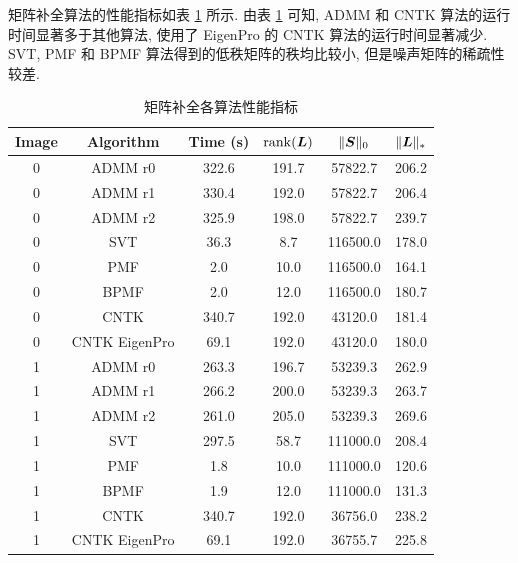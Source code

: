 \documentclass[12pt]{article}
\begin{document}
矩阵补全算法的性能指标如表 \ref{tab:mc_index} 所示. 由表 \ref{tab:mc_index} 可知, ADMM 和 CNTK 算法的运行时间显著多于其他算法, 使用了 EigenPro 的 CNTK 算法的运行时间显著减少. SVT, PMF 和 BPMF 算法得到的低秩矩阵的秩均比较小, 但是噪声矩阵的稀疏性较差.

\begin{table}[!htbp]
  \centering
  \small
  \caption{矩阵补全各算法性能指标}
  \label{tab:mc_index}
  \begin{tabular}{cccccc}
    \toprule
    Image & Algorithm     & Time (s)  & $\operatorname{rank}(\bm{L})$ & $\|\bm{S}\|_0$  & $\|\bm{L}\|_{*}$ \\
    \midrule
    0     & ADMM r0       & 322.6    & 191.7       & 57822.7     & 206.2         \\
    0     & ADMM r1       & 330.4    & 192.0       & 57822.7     & 206.4         \\
    0     & ADMM r2       & 325.9    & 198.0       & 57822.7     & 239.7         \\
    0     & SVT           & 36.3     & 8.7         & 116500.0    & 178.0         \\
    0     & PMF           & 2.0      & 10.0        & 116500.0    & 164.1         \\
    0     & BPMF          & 2.0      & 12.0        & 116500.0    & 180.7         \\
    0     & CNTK          & 340.7    & 192.0       & 43120.0     & 181.4         \\
    0     & CNTK EigenPro & 69.1     & 192.0       & 43120.0     & 180.0         \\
    1     & ADMM r0       & 263.3    & 196.7       & 53239.3     & 262.9         \\
    1     & ADMM r1       & 266.2    & 200.0       & 53239.3     & 263.7         \\
    1     & ADMM r2       & 261.0    & 205.0       & 53239.3     & 269.6         \\
    1     & SVT           & 297.5    & 58.7        & 111000.0    & 208.4         \\
    1     & PMF           & 1.8      & 10.0        & 111000.0    & 120.6         \\
    1     & BPMF          & 1.9      & 12.0        & 111000.0    & 131.3         \\
    1     & CNTK          & 340.7    & 192.0       & 36756.0     & 238.2         \\
    1     & CNTK EigenPro & 69.1     & 192.0       & 36755.7     & 225.8         \\

\end{tabular}
\end{table}
\end{document}
